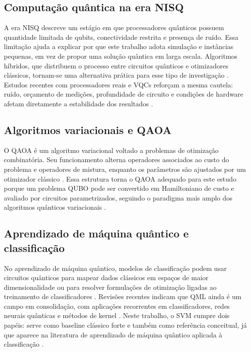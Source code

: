 \documentclass[12pt]{unisenaiclass}
\begin{document}
\subsection{Computação quântica na era NISQ}

A era NISQ descreve um estágio em que processadores quânticos possuem quantidade limitada de qubits, conectividade restrita e presença de ruído. Essa limitação ajuda a explicar por que este trabalho adota simulação e instâncias pequenas, em vez de propor uma solução quântica em larga escala. Algoritmos híbridos, que distribuem o processo entre circuitos quânticos e otimizadores clássicos, tornam-se uma alternativa prática para esse tipo de investigação \cite{preskill2018nisq,bharti2022nisq}. Estudos recentes com processadores reais e VQCs reforçam a mesma cautela: ruído, orçamento de medições, profundidade de circuito e condições de hardware afetam diretamente a estabilidade dos resultados \cite{singh2026quantumarithmetic,park2026vqcsensitivity}.

\subsection{Algoritmos variacionais e QAOA}

O QAOA é um algoritmo variacional voltado a problemas de otimização combinatória. Seu funcionamento alterna operadores associados ao custo do problema e operadores de mistura, enquanto os parâmetros são ajustados por um otimizador clássico \cite{farhi2014qaoa}. Essa estrutura torna o QAOA adequado para este estudo porque um problema QUBO pode ser convertido em Hamiltoniano de custo e avaliado por circuitos parametrizados, seguindo o paradigma mais amplo dos algoritmos quânticos variacionais \cite{cerezo2021vqa,grange2024vqa}.

\subsection{Aprendizado de máquina quântico e classificação}

No aprendizado de máquina quântico, modelos de classificação podem usar circuitos quânticos para mapear dados clássicos em espaços de maior dimensionalidade ou para resolver formulações de otimização ligadas ao treinamento de classificadores \cite{schuld2019feature,havlicek2019supervised}. Revisões recentes indicam que QML ainda é um campo em consolidação, com aplicações recorrentes em classificadores, redes neurais quânticas e métodos de kernel \cite{sood2024qmlreview}. Neste trabalho, o SVM cumpre dois papéis: serve como baseline clássico forte e também como referência conceitual, já que aparece na literatura de aprendizado de máquina quântico aplicada à classificação \cite{rebentrost2014qsvm}.
\end{document}
